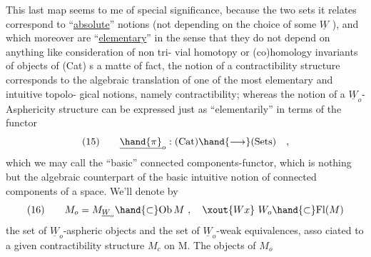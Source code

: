 This last map seems to me of special significance,  because the
two sets it relates correspond to ``\uline{absolute}'' notions  (not depending on
the choice of some $\underline{W}$ ),  and which moreover are  ``\uline{elementary}''\hand{,} in the
sense that they do not depend on anything like consideration of non tri-%
vial homotopy or (co)homology invariants of objects of (Cat)  s a matte
of fact,  the notion of a contractibility structure corresponds to the
algebraic translation of one of the most elementary and intuitive topolo-%
gical notions,   namely contractibility;  whereas the notion
of a $\underline{W}_{o}$-Asphericity structure can be expressed just as ``elementarily'' in
terms of the functor \xout{:}
\[ (15) \qquad \underline{\hand{\pi}}_{o} : (\mathrm{Cat}) \hand{\longrightarrow} (\mathrm{Sets}) \quad , \]
which we may call the ``basic'' connected components-functor,  which is
nothing but the algebraic counterpart of the basic intuitive notion of
connected components of a space.  We'll denote by
\[ (16) \qquad M_{o} = M_{\underline{W}_{o}} \hand{\subset} \mathrm{Ob}\, M \ , \quad \xout{Wx}\ W_{o} \hand{\subset} \mathrm{Fl}(M) \]
the set of $\underline{W}_{o}$-aspheric objects and the set of $\underline{W}_{o}$-weak equivalences,  asso
ciated to a given contractibility structure $M_{c}$ on M.  The objects of $M_{o}$

